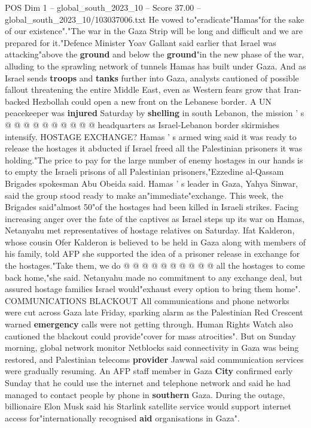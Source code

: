 \begin{textsample}{POS Dim 1 – global\_south\_2023\_10 – Score 37.00 – global\_south\_2023\_10/103037006.txt}
He vowed to"eradicate"Hamas"for the sake of our existence"."The war in the Gaza Strip will be long and difficult and we are prepared for it."Defence Minister Yoav Gallant said earlier that Israel was attacking"above the \textbf{ground} and below the \textbf{ground}"in the new phase of the war, alluding to the sprawling network of tunnels Hamas has built under Gaza.
And as Israel sends \textbf{troops} and \textbf{tanks} further into Gaza, analysts cautioned of possible fallout threatening the entire Middle East, even as Western fears grow that Iran-backed Hezbollah could open a new front on the Lebanese border.
A UN peacekeeper was \textbf{injured} Saturday by \textbf{shelling} in south Lebanon, the mission ' s @ @ @ @ @ @ @ @ @ @ headquarters as Israel-Lebanon border skirmishes intensify.
HOSTAGE EXCHANGE?
Hamas ' s armed wing said it was ready to release the hostages it abducted if Israel freed all the Palestinian prisoners it was holding."The price to pay for the large number of enemy hostages in our hands is to empty the Israeli prisons of all Palestinian prisoners,"Ezzedine al-Qassam Brigades spokesman Abu Obeida said.
Hamas ' s leader in Gaza, Yahya Sinwar, said the group stood ready to make an"immediate"exchange.
This week, the Brigades said"almost 50"of the hostages had been killed in Israeli strikes.
Facing increasing anger over the fate of the captives as Israel steps up its war on Hamas, Netanyahu met representatives of hostage relatives on Saturday.
Ifat Kalderon, whose cousin Ofer Kalderon is believed to be held in Gaza along with members of his family, told AFP she supported the idea of a prisoner release in exchange for the hostages."Take them, we do @ @ @ @ @ @ @ @ @ @ all the hostages to come back home,"she said.
Netanyahu made no commitment to any exchange deal, but assured hostage families Israel would"exhaust every option to bring them home".
COMMUNICATIONS BLACKOUT All communications and phone networks were cut across Gaza late Friday, sparking alarm as the Palestinian Red Crescent warned \textbf{emergency} calls were not getting through.
Human Rights Watch also cautioned the blackout could provide"cover for mass atrocities".
But on Sunday morning, global network monitor Netblocks said connectivity in Gaza was being restored, and Palestinian telecoms \textbf{provider} Jawwal said communication services were gradually resuming.
An AFP staff member in Gaza \textbf{City} confirmed early Sunday that he could use the internet and telephone network and said he had managed to contact people by phone in \textbf{southern} Gaza.
During the outage, billionaire Elon Musk said his Starlink satellite service would support internet access for"internationally recognised \textbf{aid} organisations in Gaza".

\end{textsample}

